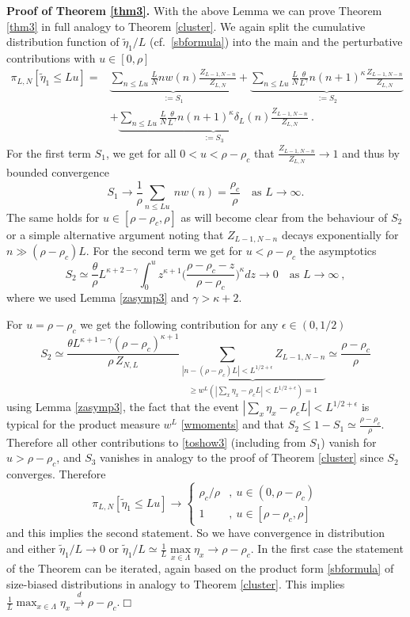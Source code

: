 \documentclass[pdflatex,sn-mathphys-num]{sn-jnl}%
\theoremstyle{thmstyleone}%
\theoremstyle{thmstyletwo}%
\theoremstyle{thmstylethree}%
\begin{document}
\noindent\textbf{Proof of Theorem \ref{thm3}.} With the above Lemma we can prove Theorem \ref{thm3} in full analogy to Theorem \ref{cluster}. 
We again split the cumulative distribution function of $\tilde{\eta}_1/L$ (cf.\ \eqref{sbformula}) into the main and the perturbative contributions with $u\in [0,\rho ]$
\begin{align}
	\pi_{L,N}\left[\tilde{\eta}_1 \leq L u\right]  =&\underbrace{\sum_{n \leq L u} \frac{L}{N} n w(n) \frac{Z_{L-1,N-n}}{Z_{L,N}}}_{:=S_1} +\underbrace{\sum_{n \leq L u} \frac{L}{N} \frac{\theta}{L^\gamma} n(n+1)^\kappa \frac{Z_{L-1,N-n}}{Z_{L,N}}}_{:=S_2}\nonumber\\
	&+\underbrace{\sum_{n \leq L u} \frac{L}{N} \frac{\theta}{L^\gamma} n(n+1)^\kappa \delta_L (n) \frac{Z_{L-1,N-n}}{Z_{L,N}}}_{:=S_3}\ .\label{toshow3}
\end{align}
For the first term $S_1$, we get for all $0<u<\rho -\rho_c$ that $\frac{Z_{L-1,N-n}}{Z_{L,N}}\to 1$ and thus by bounded convergence
\[
S_1 \to \frac{1}{\rho}\sum_{n \leq L u} \ n w(n)=\frac{\rho_c}{\rho}\quad\mbox{as }L\to\infty .
\]
The same holds for $u\in [\rho -\rho_c ,\rho ]$ as will become clear from the behaviour of $S_2$ or a simple alternative argument noting that $Z_{L-1 ,N-n}$ decays exponentially for $n\gg (\rho -\rho_c )L$. 
For the second term we get for $u<\rho -\rho_c$ the asymptotics
\[
S_2 \simeq \frac{\theta}{\rho} L^{\kappa +2-\gamma} \int_0^u z^{\kappa +1} \Big(\frac{\rho -\rho_c -z}{\rho -\rho_c} \Big)^\kappa dz\to 0\quad\mbox{as }L\to\infty\ ,
\]
where we used Lemma \ref{zasymp3} and $\gamma >\kappa +2$.

For $u=\rho -\rho_c$ we get the following contribution for any $\epsilon\in (0,1/2)$
\[
S_2 \simeq \frac{\theta L^{\kappa +1-\gamma} (\rho -\rho_c )^{\kappa +1} }{\rho \, Z_{N,L}} \underbrace{\sum_{|n-(\rho -\rho_c )L|<L^{1/2+\epsilon}} Z_{L-1,N-n}}_{\geq w^L (|\sum_x \eta_x -\rho_c L|<L^{1/2+\epsilon} )=1} \simeq \frac{\rho -\rho_c}{\rho}
\]
using Lemma \ref{zasymp3}, the fact that the event $|\sum_x \eta_x -\rho_c L|<L^{1/2+\epsilon}$ is typical for the product measure $w^L$ \eqref{wmoments} and that $S_2 \leq 1- S_1 \simeq \frac{\rho -\rho_c}{\rho}$. Therefore all other contributions to \eqref{toshow3} (including from $S_1$) vanish for $u>\rho-\rho_c$, and $S_3$ vanishes in analogy to the proof of Theorem \ref{cluster} since $S_2$ converges. Therefore
\[
\pi_{L,N}\left[\tilde{\eta}_1 \leq L u\right] \to \begin{cases}
    \rho_c /\rho &,\ u\in (0,\rho -\rho_c )\\
    1 &,\ u\in [\rho -\rho_c ,\rho ]
\end{cases}
\]
and this implies the second statement. So we have convergence in distribution and either $\tilde\eta_1 /L\to 0$ or $\tilde\eta_1 /L\simeq\frac1L\max\limits_{x\in\Lambda} \eta_x \to \rho -\rho_c$. In the first case the statement of the Theorem can be iterated, again based on the product form \eqref{sbformula} of size-biased distributions in analogy to Theorem \ref{cluster}. This implies $\frac1L\max_{x\in\Lambda} \eta_x \overset{d}{\longrightarrow} \rho -\rho_c$.\hfill $\Box$\\



\end{document}
